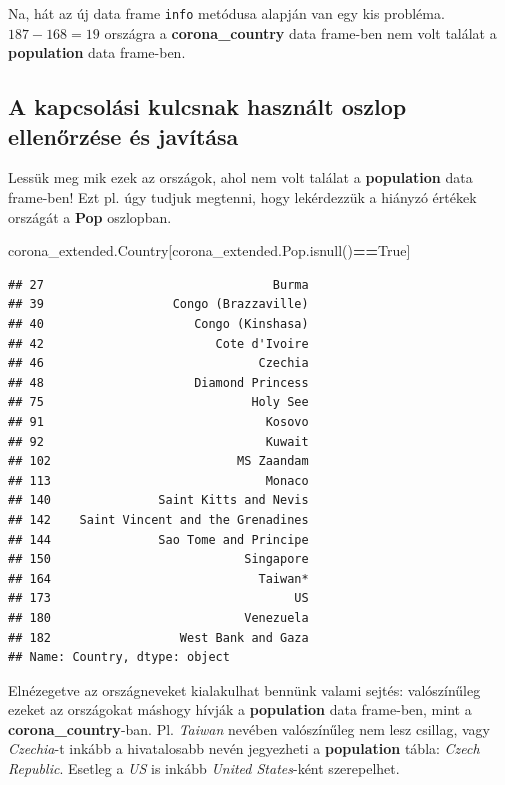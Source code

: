 \documentclass[
]{book}
\newenvironment{Shaded}{\begin{snugshade}}{\end{snugshade}}
\newcommand{\NormalTok}[1]{#1}
\newcommand{\OperatorTok}[1]{\textcolor[rgb]{0.81,0.36,0.00}{\textbf{#1}}}
\newcommand{\VariableTok}[1]{\textcolor[rgb]{0.00,0.00,0.00}{#1}}
\begin{document}
Na, hát az új data frame \texttt{info} metódusa alapján van egy kis probléma. \(187-168=19\) országra a \textbf{corona\_country} data frame-ben nem volt találat a \textbf{population} data frame-ben.

\subsection{A kapcsolási kulcsnak használt oszlop ellenőrzése és javítása}\label{a-kapcsoluxe1si-kulcsnak-hasznuxe1lt-oszlop-ellenux151rzuxe9se-uxe9s-javuxedtuxe1sa}

Lessük meg mik ezek az országok, ahol nem volt találat a \textbf{population} data frame-ben! Ezt pl. úgy tudjuk megtenni, hogy lekérdezzük a hiányzó értékek országát a \textbf{Pop} oszlopban.

\begin{Shaded}
\begin{Highlighting}[]
\NormalTok{corona\_extended.Country[corona\_extended.Pop.isnull()}\OperatorTok{==}\VariableTok{True}\NormalTok{]}
\end{Highlighting}
\end{Shaded}

\begin{verbatim}
## 27                                Burma
## 39                  Congo (Brazzaville)
## 40                     Congo (Kinshasa)
## 42                        Cote d'Ivoire
## 46                              Czechia
## 48                     Diamond Princess
## 75                             Holy See
## 91                               Kosovo
## 92                               Kuwait
## 102                          MS Zaandam
## 113                              Monaco
## 140               Saint Kitts and Nevis
## 142    Saint Vincent and the Grenadines
## 144               Sao Tome and Principe
## 150                           Singapore
## 164                             Taiwan*
## 173                                  US
## 180                           Venezuela
## 182                  West Bank and Gaza
## Name: Country, dtype: object
\end{verbatim}

Elnézegetve az országneveket kialakulhat bennünk valami sejtés: valószínűleg ezeket az országokat máshogy hívják a \textbf{population} data frame-ben, mint a \textbf{corona\_country}-ban. Pl. \emph{Taiwan} nevében valószínűleg nem lesz csillag, vagy \emph{Czechia}-t inkább a hivatalosabb nevén jegyezheti a \textbf{population} tábla: \emph{Czech Republic}. Esetleg a \emph{US} is inkább \emph{United States}-ként szerepelhet.
\end{document}
